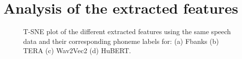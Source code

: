 \section{Analysis of the extracted features}
\begin{figure}[h]
  \begin{center}
  \centering
  \caption{T-SNE plot of the different extracted features using the same speech data and their corresponding phoneme labels for: (a) Fbanks (b) TERA (c) Wav2Vec2 (d) HuBERT.}
  \label{fig:tsne_SSL}  
\end{center}
\end{figure}

